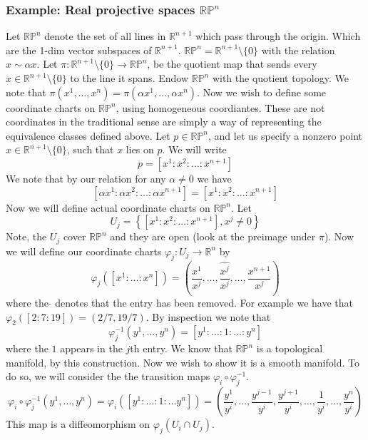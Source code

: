 \documentclass[a4paper]{article}
\begin{document}
\subsubsection*{Example: Real projective spaces $\mathds{RP}^n$}
Let $\mathds{RP}^n$ denote the set of all lines in $\mathds{R}^{n+1}$ which pass through the origin. Which are the 1-dim vector subspaces of $\mathds{R}^{n+1}$. $\mathds{RP}^n = \mathds{R}^{n+1} \setminus \{0\}$ with the relation $x \sim \alpha x$. Let $\pi: \mathds{R}^{n+1} \setminus \{0\} \rightarrow \mathds{RP}^n$, be the quotient map that sends every $x \in \mathds{R}^{n+1} \setminus \{0\}$ to the line it spans. Endow $\mathds{RP}^n$ with the quotient topology. We note that $\pi(x^1, \dots, x^n) = \pi(\alpha x^1, \dots, \alpha x^n)$. Now we wish to define some coordinate charts on $\mathds{RP}^n$, using homogeneous coordiantes. These are not coordinates in the traditional sense are simply a way of representing the equivalence classes defined above. Let $p \in \mathds{RP}^n$, and let us specify a nonzero point $x \in \mathds{R}^{n+1} \setminus \{0\}$, such that $x$ lies on $p$. We will write
\[
  p = [x^1 : x^2: \dots : x^{n+1}]
\]
We note that by our relation for any $\alpha \neq 0$ we have
\[
 [\alpha x^1 :\alpha  x^2: \dots :\alpha  x^{n+1}] = [x^1 : x^2: \dots : x^{n+1}]
\]
Now we will define actual coordinate charts on $\mathds{RP}^n$. Let
\[
  U_j = \left\{[x^1 : x^2: \dots : x^{n+1}], x^j \neq 0\right\}
\]
Note, the $U_j$ cover $\mathds{RP}^n$ and they are open (look at the preimage under $\pi$). Now we will define our coordinate charts $\varphi_j: U_j \rightarrow \mathds{R}^n$ by
\[
  \varphi_j ([x^1: \dots : x^n]) = \left(\frac{x^1}{x^j}, \dots, \hat{\frac{x^j}{x^j}}, \dots, \frac{x^{n+1}}{x^j}\right)
\]
where the $\hat{}$ denotes that the entry has been removed. For example we have that $\varphi_2 ([2:7:19]) = (2/7, 19/7)$. By inspection we note that
\[
  \varphi_j^{-1}(y^1, \dots, y^n) = [y^1: \dots: 1: \dots: y^n]
\]
where the $1$ appears in the $j$th entry. We know that $\mathds{RP}^n$ is a topological manifold, by this construction. Now we wish to show it is a smooth manifold. To do so, we will consider the the transition maps $\varphi_i \circ \varphi_j^{-1}$.
\[
  \varphi_i \circ \varphi_j^{-1}(y^1, \dots, y^n) = \varphi_i( [y^1: \dots: 1: \dots y^n])
  = \left( \frac{y^1}{y^i}, \dots, \frac{y^{j-1}}{y^i}, \frac{y^{j+1}}{y^i}, \dots, \frac{1}{y^i}, \dots, \frac{y^n}{y^i} \right)
\]
This map is a diffeomorphism on $\varphi_j(U_i \cap U_j)$.
\end{document}
